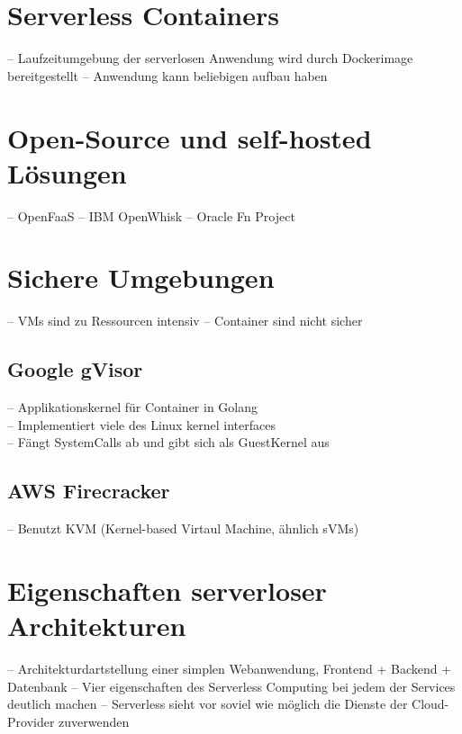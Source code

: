 \section{Serverless Containers}
-- Laufzeitumgebung der serverlosen Anwendung wird durch Dockerimage bereitgestellt
-- Anwendung kann beliebigen aufbau haben

\section{Open-Source und self-hosted Lösungen}
-- OpenFaaS
-- IBM OpenWhisk
-- Oracle Fn Project

\section{Sichere Umgebungen}
-- VMs sind zu Ressourcen intensiv
-- Container sind nicht sicher

\subsection{Google gVisor}
-- Applikationskernel für Container in Golang\\
-- Implementiert viele des Linux kernel interfaces\\
-- Fängt SystemCalls ab und gibt sich als GuestKernel aus\\

\subsection{AWS Firecracker}
-- Benutzt KVM (Kernel-based Virtaul Machine, ähnlich sVMs)\\

\section{Eigenschaften serverloser Architekturen}
-- Architekturdartstellung einer simplen Webanwendung, Frontend + Backend + Datenbank
-- Vier eigenschaften des Serverless Computing bei jedem der Services deutlich machen
-- Serverless sieht vor soviel wie möglich die Dienste der Cloud-Provider zuverwenden